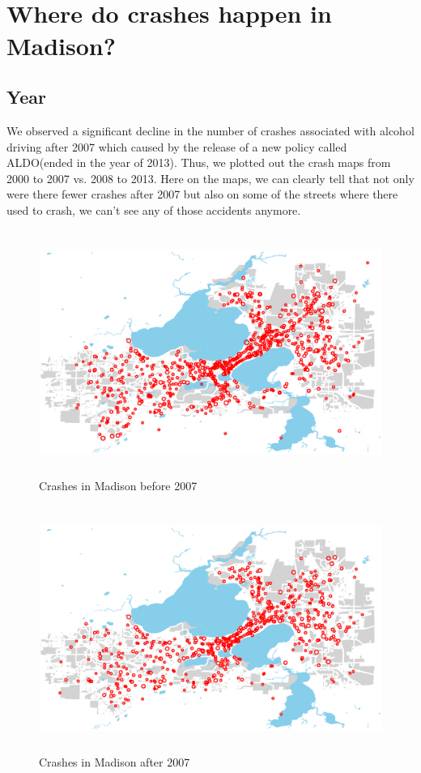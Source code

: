 \documentclass[15pt]{article}
\begin{document}
~\\
~\\
\section{Where do crashes happen in Madison?}
\subsection{Year}
We observed a significant decline in the number of crashes associated with alcohol driving after 2007 which caused by the release of a new policy called ALDO(ended in the year of 2013). Thus, we plotted out the crash maps from 2000 to 2007 vs. 2008 to 2013. Here on the maps, we can clearly tell that not only were there fewer crashes after 2007 but also on some of the streets where there used to crash, we can’t see any of those accidents anymore.
\begin{figure}[H]
\raggedleft
\includegraphics[height=80mm]{year1.eps}
\caption{Crashes in Madison before 2007}
\end{figure}

\begin{figure}[H]
\raggedleft
\includegraphics[height=80mm]{year2.eps}
\caption{Crashes in Madison after 2007}
\end{figure}
\end{document}

